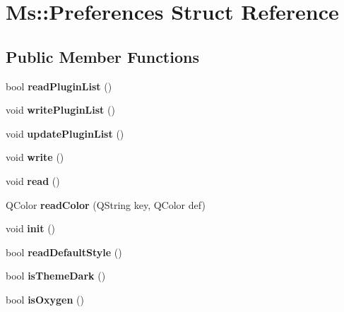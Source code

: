 \hypertarget{struct_ms_1_1_preferences}{}\section{Ms\+:\+:Preferences Struct Reference}
\label{struct_ms_1_1_preferences}
\subsection*{Public Member Functions}
\begin{DoxyCompactItemize}
\item 
\mbox{\label{struct_ms_1_1_preferences_aae8b1942ac1be3e073cf483e577eed43}} 
bool {\bfseries read\+Plugin\+List} ()
\item 
\mbox{\label{struct_ms_1_1_preferences_abdfae4eed5f8a22440888021978c0cda}} 
void {\bfseries write\+Plugin\+List} ()
\item 
\mbox{\label{struct_ms_1_1_preferences_a8da42a791bc04f988214128390bc91bd}} 
void {\bfseries update\+Plugin\+List} ()
\item 
\mbox{\label{struct_ms_1_1_preferences_a824533c736c25cf4c1fd6bff4cde3eda}} 
void {\bfseries write} ()
\item 
\mbox{\label{struct_ms_1_1_preferences_a70b3e9b82e69a2ab56c51416b271c061}} 
void {\bfseries read} ()
\item 
\mbox{\label{struct_ms_1_1_preferences_a67ffd8425de5952f48c1c7a41a12ac42}} 
Q\+Color {\bfseries read\+Color} (Q\+String key, Q\+Color def)
\item 
\mbox{\label{struct_ms_1_1_preferences_a34e1fa20e38a5fc2d124ef13de3d6aa1}} 
void {\bfseries init} ()
\item 
\mbox{\label{struct_ms_1_1_preferences_a4447c581aa9fa8e0366d81ebd4b37f55}} 
bool {\bfseries read\+Default\+Style} ()
\item 
\mbox{\label{struct_ms_1_1_preferences_ab49c7c8a37fd119f031b348933d5802c}} 
bool {\bfseries is\+Theme\+Dark} ()
\item 
\mbox{\label{struct_ms_1_1_preferences_ac35a86df1ac7bdef8f3b12e21a225aa9}} 
bool {\bfseries is\+Oxygen} ()
\end{DoxyCompactItemize}
